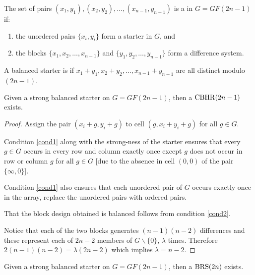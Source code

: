 The set of pairs $(x_1, y_1), (x_2, y_2), \ldots, (x_{n - 1}, y_{n - 1})$ is a  in $G = GF(2n - 1)$ if:
\begin{enumerate}
  \item{the unordered pairs $\{x_i, y_i\}$ form a starter in
    $G$, and} \label{cond1}
  \item{the blocks $\{x_1, x_2, \ldots, x_{n - 1}\}$ and
    $\{y_1, y_2, \ldots, y_{n - 1}\}$ form a difference system.} \label{cond2}
\end{enumerate}

A balanced starter is  if $x_1 + y_1, x_2 + y_2, \ldots, x_{n - 1} + y_{n - 1}$ are all distinct modulo $(2n - 1)$.

\begin{theorem}
Given a strong balanced starter on $G = GF(2n - 1)$, then a $\operatorname{CBHR}(2n - 1)$ exists.
\end{theorem}

\begin{proof}
Assign the pair $(x_i + g, y_i + g)$ to cell $(g, x_i + y_i + g)$ for all $g \in G$.

Condition \ref{cond1} along with the strong-ness of the starter ensures that every $g \in G$ occurs in every row and column exactly once except $g$ does not occur in row or column $g$ for all $g \in G$ [due to the absence in cell
$(0, 0)$ of the pair $\{\infty, 0\}$].

Condition \ref{cond1} also ensures that each unordered pair of $G$ occurs exactly once in the array, replace the unordered pairs with ordered pairs.

That the block design obtained is balanced follows from condition \ref{cond2}.

Notice that each of the two blocks generates $(n - 1)(n - 2)$ differences and these represent each of $2n - 2$ members of $G \backslash \{0\}$, $\lambda$ times.
Therefore $2(n - 1)(n - 2) = \lambda (2n - 2)$ which implies $\lambda = n - 2$.
\end{proof}

\begin{theorem}
Given a strong balanced starter on $G = GF(2n - 1)$, then a $\operatorname{BRS}(2n)$ exists.
\end{theorem}

